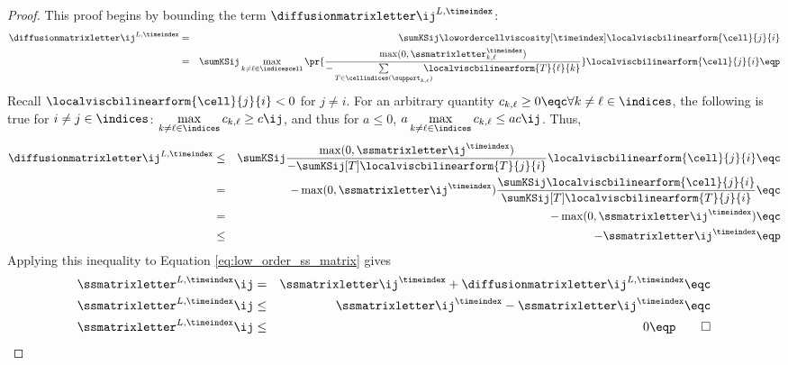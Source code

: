 \begin{proof}
This proof begins by bounding the term $\diffusionmatrixletter\ij^{L,\timeindex}$:
\begin{eqnarray*}
   \diffusionmatrixletter\ij^{L,\timeindex}
   & = &
     \sumKSij\lowordercellviscosity[\timeindex]
   \localviscbilinearform{\cell}{j}{i}\\
   & = & \sumKSij\max\limits_{k\ne \ell\in \indicescell}
     \pr{\frac{\max(0,\ssmatrixletter_{k,\ell}^\timeindex)}
       {-\sum\limits_{T\in\cellindices(\support_{k,\ell})}
       \mkern-20mu\localviscbilinearform{T}{\ell}{k}}}
     \localviscbilinearform{\cell}{j}{i} \eqp
\end{eqnarray*}
Recall $\localviscbilinearform{\cell}{j}{i} < 0$ for $j\ne i$.
For an arbitrary quantity $c_{k,\ell} \geq 0 \eqc \forall k\ne\ell\in\indices$,
the following is true for $i\ne j\in\indices$:
$\max\limits_{k\ne\ell\in\indices}c_{k,\ell} \geq c\ij$, and thus for $a\leq 0$,
$a\max\limits_{k\ne\ell\in\indices}c_{k,\ell} \leq a c\ij$.
Thus,
\begin{eqnarray*}
   \diffusionmatrixletter\ij^{L,\timeindex} & \le &
     \sumKSij \frac{\max(0,\ssmatrixletter\ij^\timeindex)}
   {-\sumKSij[T]\localviscbilinearform{T}{j}{i}}
   \localviscbilinearform{\cell}{j}{i} \eqc\\
   &  =  & -\max(0,\ssmatrixletter\ij^\timeindex)
     \frac{\sumKSij\localviscbilinearform{\cell}{j}{i}}
     {\sumKSij[T]\localviscbilinearform{T}{j}{i}} \eqc\\
   &  =  & -\max(0,\ssmatrixletter\ij^\timeindex) \eqc\\
   & \le & -\ssmatrixletter\ij^\timeindex \eqp
\end{eqnarray*}
Applying this inequality to Equation \eqref{eq:low_order_ss_matrix} gives
\begin{eqnarray*}
  \ssmatrixletter^{L,\timeindex}\ij &  =  &
    \ssmatrixletter\ij^\timeindex + \diffusionmatrixletter\ij^{L,\timeindex}
    \eqc\\
  \ssmatrixletter^{L,\timeindex}\ij & \le &
    \ssmatrixletter\ij^\timeindex - \ssmatrixletter\ij^\timeindex
    \eqc\\
  \ssmatrixletter^{L,\timeindex}\ij & \le & 0 \eqp \qed
\end{eqnarray*}
\end{proof}
